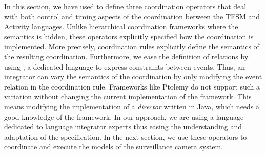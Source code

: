 In this section, we have used \bcool to define three coordination operators that deal with both control and timing aspects of the coordination between the TFSM and Activity languages. Unlike hierarchical coordination frameworks where the semantics is hidden, these operators explicitly specified how the coordination is implemented. More precisely, coordination rules explicitly define the semantics of the resulting coordination. Furthermore, we ease the definition of relations by using \moccml, a dedicated language to express constraints between events. Thus, an integrator can vary the semantics of the coordination by only modifying the event relation in the coordination rule. Frameworks like Ptolemy do not support such a variation without changing the current implementation of the framework. This means modifying the implementation of a \emph{director} written in Java, which needs a good knowledge of the framework. In our approach, we are using a language dedicated to language integrator experts thus easing the understanding and adaptation of the \bcool specification. In the next section, we use these operators to coordinate and execute the models of the surveillance camera system.
	 


  




















